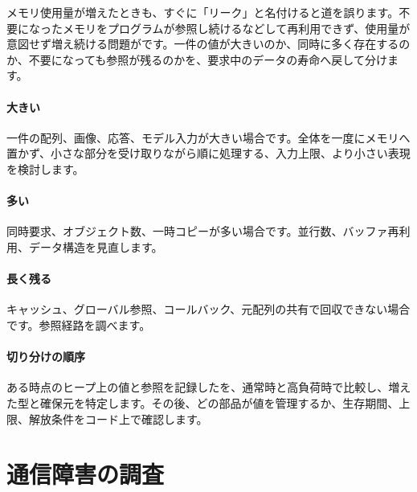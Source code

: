 メモリ使用量が増えたときも、すぐに「リーク」と名付けると道を誤ります。不要になったメモリをプログラムが参照し続けるなどして再利用できず、使用量が意図せず増え続ける問題がです。一件の値が大きいのか、同時に多く存在するのか、不要になっても参照が残るのかを、要求中のデータの寿命へ戻して分けます。

\begingroup
\begingroup
\paragraph{大きい}
        一件の配列、画像、応答、モデル入力が大きい場合です。全体を一度にメモリへ置かず、小さな部分を受け取りながら順に処理する、入力上限、より小さい表現を検討します。

\par
\endgroup
\medskip
\begingroup
\paragraph{多い}
        同時要求、オブジェクト数、一時コピーが多い場合です。並行数、バッファ再利用、データ構造を見直します。

\par
\endgroup
\medskip
\begingroup
\paragraph{長く残る}
        キャッシュ、グローバル参照、コールバック、元配列の共有で回収できない場合です。参照経路を調べます。

\par
\endgroup
  \vspace{5mm}
\paragraph{切り分けの順序}
    ある時点のヒープ上の値と参照を記録したを、通常時と高負荷時で比較し、増えた型と確保元を特定します。その後、どの部品が値を管理するか、生存期間、上限、解放条件をコード上で確認します。

\par
\endgroup


\section{通信障害の調査}
\label{sec:07-practice-10}

